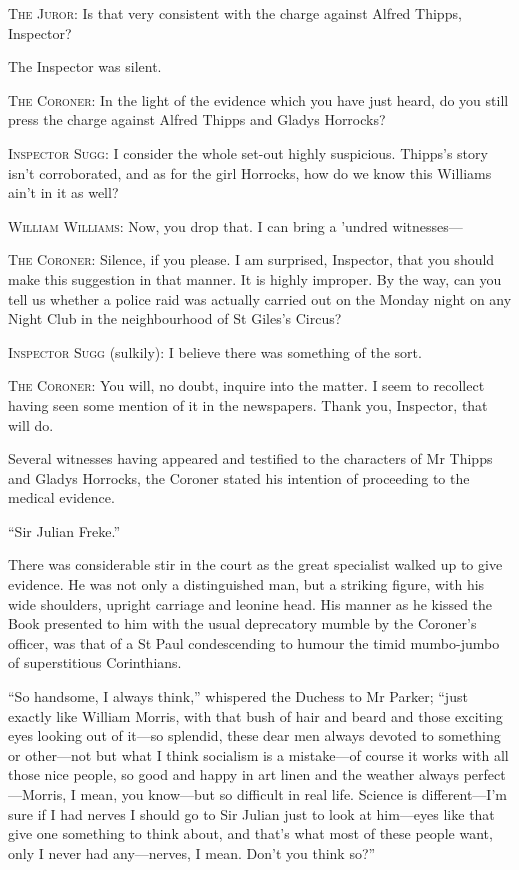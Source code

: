 \textsc{The Juror}: Is that very consistent with the charge against Alfred Thipps, Inspector?

The Inspector was silent.

\textsc{The Coroner}: In the light of the evidence which you have just heard, do you still press the charge against Alfred Thipps and Gladys Horrocks?

\textsc{Inspector Sugg}: I consider the whole set-out highly suspicious. Thipps’s story isn’t corroborated, and as for the girl Horrocks, how do we know this Williams ain’t in it as well?

\textsc{William Williams}: Now, you drop that. I can bring a ’undred witnesses---

\textsc{The Coroner}: Silence, if you please. I am surprised, Inspector, that you should make this suggestion in that manner. It is highly improper. By the way, can you tell us whether a police raid was actually carried out on the Monday night on any Night Club in the neighbourhood of St Giles’s Circus?

\textsc{Inspector Sugg} (sulkily): I believe there was something of the sort.

\textsc{The Coroner}: You will, no doubt, inquire into the matter. I seem to recollect having seen some mention of it in the newspapers. Thank you, Inspector, that will do.

Several witnesses having appeared and testified to the characters of Mr Thipps and Gladys Horrocks, the Coroner stated his intention of proceeding to the medical evidence.

\enquote{Sir Julian Freke.}

There was considerable stir in the court as the great specialist walked up to give evidence. He was not only a distinguished man, but a striking figure, with his wide shoulders, upright carriage and leonine head. His manner as he kissed the Book presented to him with the usual deprecatory mumble by the Coroner’s officer, was that of a St Paul condescending to humour the timid mumbo-jumbo of superstitious Corinthians.

\enquote{So handsome, I always think,} whispered the Duchess to Mr Parker; \enquote{just exactly like William Morris, with that bush of hair and beard and those exciting eyes looking out of it\allowbreak---\allowbreak so splendid, these dear men always devoted to something or other\allowbreak---\allowbreak not but what I think socialism is a mistake\allowbreak---\allowbreak of course it works with all those nice people, so good and happy in art linen and the weather always perfect\allowbreak---\allowbreak Morris, I mean, you know\allowbreak---\allowbreak but so difficult in real life. Science is different\allowbreak---\allowbreak I’m sure if I had nerves I should go to Sir Julian just to look at him\allowbreak---\allowbreak eyes like that give one something to think about, and that’s what most of these people want, only I never had any\allowbreak---\allowbreak nerves, I mean. Don’t you think so?}

